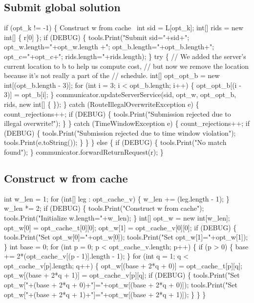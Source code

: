 \subsection{Submit global solution}
\nwenddocs{}\endmoddef\nwstartdeflinemarkup{}\nwenddeflinemarkup
if (opt_k != -1) \{
  \LA{}Construct w from cache~{\nwtagstyle{}}\RA{}
  int sid = L[opt_k];
  int[] rids = new int[] \{ r[0] \};
  if (DEBUG) \{
    tools.Print("Submit sid="+sid+"; opt_w.length="+opt_w.length
      +"; opt_b.length="+opt_b.length+"; opt_c="+opt_c+"; rids.length="+rids.length);
  \}
  try \{
    // We added the server's current location to b to help us compute cost,
    // but now we remove the location because it's not really a part of the
    // schedule.
    int[] opt_opt_b = new int[(opt_b.length - 3)];
    for (int i = 3; i < opt_b.length; i++) \{
      opt_opt_b[(i - 3)] = opt_b[i];
    \}
    communicator.updateServerService(sid, opt_w, opt_opt_b, rids, new int[] \{ \});
  \} catch (RouteIllegalOverwriteException e) \{
    count_rejections++;
    if (DEBUG) \{
      tools.Print("Submission rejected due to illegal overwrite!");
    \}
  \} catch (TimeWindowException e) \{
    count_rejections++;
    if (DEBUG) \{
      tools.Print("Submission rejected due to time window violation");
      tools.Print(e.toString());
    \}
  \}
\} else \{
  if (DEBUG) \{
    tools.Print("No match found");
  \}
  communicator.forwardReturnRequest(r);
\}
\nwendcode{}\nwdocspar

\subsection{Construct w from cache}
\nwenddocs{}\endmoddef\nwstartdeflinemarkup{}\nwenddeflinemarkup
int w_len = 1;
for (int[] leg : opt_cache_v) \{
  w_len += (leg.length - 1);
\}
w_len *= 2;
if (DEBUG) \{
  tools.Print("Construct w from cache");
  tools.Print("Initialize w.length="+w_len);
\}
int[] opt_w = new int[w_len];
opt_w[0] = opt_cache_t[0][0];
opt_w[1] = opt_cache_v[0][0];
if (DEBUG) \{
  tools.Print("Set opt_w[0]="+opt_w[0]);
  tools.Print("Set opt_w[1]="+opt_w[1]);
\}
int base = 0;
for (int p = 0; p < opt_cache_v.length; p++) \{
  if (p > 0) \{
    base += 2*(opt_cache_v[(p - 1)].length - 1);
  \}
  for (int q = 1; q < opt_cache_v[p].length; q++) \{
    opt_w[(base + 2*q + 0)] = opt_cache_t[p][q];
    opt_w[(base + 2*q + 1)] = opt_cache_v[p][q];
    if (DEBUG) \{
      tools.Print("Set opt_w["+(base + 2*q + 0)+"]="+opt_w[(base + 2*q + 0)]);
      tools.Print("Set opt_w["+(base + 2*q + 1)+"]="+opt_w[(base + 2*q + 1)]);
    \}
  \}
\}
\nwendcode{}\nwdocspar

